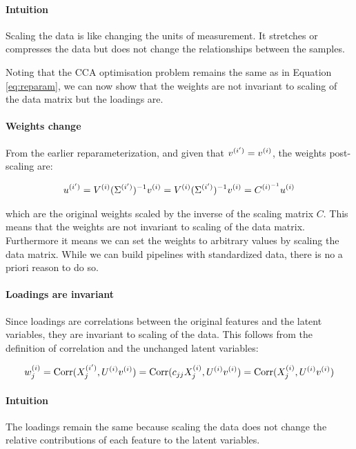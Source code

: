 \paragraph{Intuition}
Scaling the data is like changing the units of measurement.
It stretches or compresses the data but does not change the relationships between the samples.

Noting that the CCA optimisation problem remains the same as in Equation \ref{eq:reparam},
we can now show that the weights are not invariant to scaling of the data matrix but the \gls{loadings} are.

\paragraph{Weights change}

From the earlier reparameterization, and given that $v^{(i')}=v^{(i)}$, the weights post-scaling are:

\begin{align}
    u^{(i')} = V^{(i)}(\Sigma^{(i')})^{-1}v^{(i)} = V^{(i)}(\Sigma^{(i')})^{-1}v^{(i)} = C^{{(i)}^{-1}}u^{(i)} \label{eq:weights_change}
\end{align}

which are the original weights scaled by the inverse of the scaling matrix \( C \). This means that the weights are not invariant to scaling of the data matrix. Furthermore it means we can set the weights to arbitrary values by scaling the data matrix.
While we can build pipelines with standardized data, there is no a priori reason to do so.

\paragraph{Loadings are invariant}

Since \gls{loadings} are correlations between the original features and the latent variables, they are invariant to scaling of the data.
This follows from the definition of correlation and the unchanged latent variables:

\begin{align}
    w^{(i)}_j = \operatorname{Corr}(X^{(i')}_j, U^{(i)}v^{(i)}) = \operatorname{Corr}(c_{jj}X^{(i)}_j, U^{(i)}v^{(i)}) = \operatorname{Corr}(X^{(i)}_j, U^{(i)}v^{(i)}) \label{eq:loading_invariant}
\end{align}

\paragraph{Intuition}
The \gls{loadings} remain the same because scaling the data does not change the relative contributions of each feature to the latent variables.

